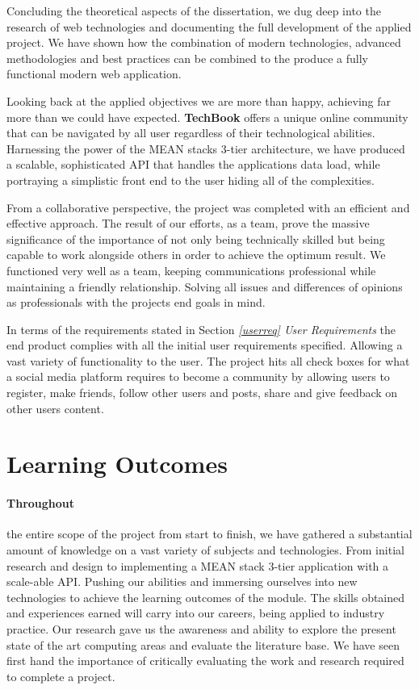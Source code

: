 Concluding the theoretical aspects of the dissertation, we dug deep into the research of web technologies and documenting the full development of the applied project. We have shown how the combination of modern technologies, advanced methodologies and best practices can be combined to the produce a fully functional modern web application.

Looking back at the applied objectives we are more than happy, achieving far more than we could have expected. \textbf{TechBook} offers a unique online community that can be navigated by all user regardless of their technological abilities. Harnessing the power of the MEAN stacks 3-tier architecture, we have produced a scalable, sophisticated API that handles the applications data load, while portraying a simplistic front end to the user hiding all of the complexities. 

From a collaborative perspective, the project was completed with an efficient and effective approach. The result of our efforts, as a team, prove the massive significance of the importance of not only being technically skilled but being capable to work alongside others in order to achieve the optimum result. We functioned very well as a team, keeping communications professional while maintaining a friendly relationship. Solving all issues and differences of opinions as professionals with the projects end goals in mind. 

In terms of the requirements stated in Section \textit{\ref{userreq} User Requirements} the end product complies with all the initial user requirements specified. Allowing a vast variety of functionality to the user. The project hits all check boxes for what a social media platform requires to become a community by allowing users to register, make friends, follow other users and posts, share and give feedback on other users content.

\section{Learning Outcomes}
\paragraph{Throughout} the entire scope of the project from start to finish, we have gathered a substantial amount of knowledge on a vast variety of subjects and technologies. From initial research and design to implementing a MEAN stack 3-tier application with a scale-able API.  Pushing our abilities and immersing ourselves into new technologies to achieve the learning outcomes of the module. The skills obtained and experiences earned will carry into our careers, being applied to industry practice. Our research gave us the awareness and ability to explore the present state of the art computing areas and evaluate the literature base. We have seen first hand the importance of critically evaluating the work and research required to complete a project.

